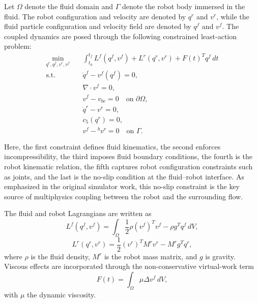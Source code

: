 Let $\Omega$ denote the fluid domain and $\Gamma$ denote the robot body immersed in the fluid. The robot configuration and velocity are denoted by $q^r$ and $v^r$, while the fluid particle configuration and velocity field are denoted by $q^f$ and $v^f$. The coupled dynamics are posed through the following constrained least-action problem:
\begin{equation}
\begin{aligned}
\min_{q^r,q^f,v^r,v^f}\quad & \int_{t_0}^{t_f} L^f(q^f,v^f) + L^r(q^r,v^r) + F(t)^T q^f \, dt \\
\text{s.t.}\quad 
& \dot{q}^f - v^f(q^f) = 0, \\
& \nabla \cdot v^f = 0, \\
& v^f - v_{bc} = 0 \quad \text{on } \partial \Omega, \\
& \dot{q}^r - v^r = 0, \\
& c_5(q^r) = 0, \\
& v^f - {}^b v^r = 0 \quad \text{on } \Gamma .
\end{aligned}
\label{eq:thesis_fsi_unified_opt}
\end{equation}

Here, the first constraint defines fluid kinematics, the second enforces incompressibility, the third imposes fluid boundary conditions, the fourth is the robot kinematic relation, the fifth captures robot configuration constraints such as joints, and the last is the no-slip condition at the fluid--robot interface. As emphasized in the original simulator work, this no-slip constraint is the key source of multiphysics coupling between the robot and the surrounding flow.

The fluid and robot Lagrangians are written as
\begin{equation}
L^f(q^f,v^f) = \int_{\Omega} \frac{1}{2}\rho (v^f)^T v^f - \rho g^T q^f \, dV,
\label{eq:thesis_fluid_lagrangian}
\end{equation}
\begin{equation}
L^r(q^r,v^r) = \frac{1}{2}(v^r)^T M^r v^r - M^r g^T q^r,
\label{eq:thesis_robot_lagrangian}
\end{equation}
where $\rho$ is the fluid density, $M^r$ is the robot mass matrix, and $g$ is gravity. Viscous effects are incorporated through the non-conservative virtual-work term
\begin{equation}
F(t) = \int_{\Omega} \mu \Delta v^f \, dV,
\label{eq:thesis_viscous_force}
\end{equation}
with $\mu$ the dynamic viscosity.

